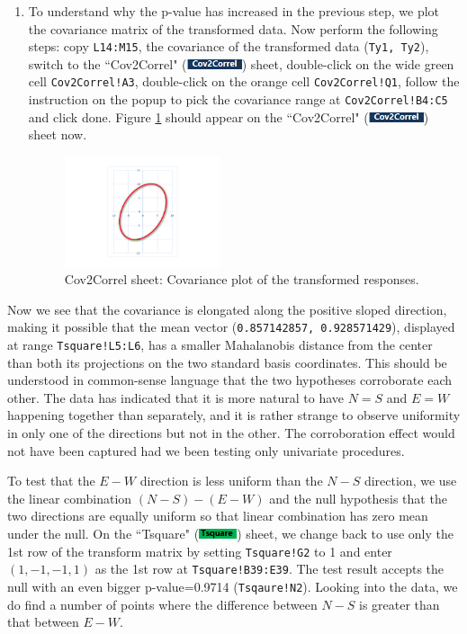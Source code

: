 \documentclass[article]{jss}
\newcommand{\shtTsquare}{``Tsquare" (\includegraphics[height=8pt, keepaspectratio=true]{TsquareSheetTab_png}) }
\newcommand{\shtCovCorrel}{``Cov2Correl" (\includegraphics[height=8pt, keepaspectratio=true]{Cov2CorrelSheetTab_png}) }
\begin{document}
\begin{enumerate}
                \item To understand why the p-value has increased in the previous step, we plot the covariance matrix of the transformed data. Now perform the following steps: copy \texttt{L14:M15}, the covariance of the transformed data (\texttt{Ty1, Ty2}), switch to the \shtCovCorrel sheet, double-click on the wide green cell \texttt{Cov2Correl!A3}, double-click on the orange cell \texttt{Cov2Correl!Q1}, follow the instruction on the popup to pick the covariance range at \texttt{Cov2Correl!B4:C5} and click done. Figure \ref{fig:Cov2Correl_PlotCov} should appear on the \shtCovCorrel sheet now.
                
                \begin{figure}
                        \includegraphics[width=130pt,keepaspectratio=true]{img/Cov2Correl_PlotCov}
                        \vspace{-20pt}\centering\protect\caption{Cov2Correl sheet: Covariance plot of the transformed responses.}\label{fig:Cov2Correl_PlotCov}
                \end{figure}
                
        \end{enumerate}
        
        Now we see that the covariance is elongated along the positive sloped direction, making it possible that the mean vector (\texttt{0.857142857, 0.928571429}), displayed at range \texttt{Tsquare!L5:L6}, has a smaller Mahalanobis distance from the center than both its projections on the two standard basis coordinates. This should be understood in common-sense language that the two hypotheses corroborate each other. The data has indicated that it is more natural to have $N=S$ and $E=W$ happening together than separately, and it is rather strange to observe uniformity in only one of the directions but not in the other. The corroboration effect would not have been captured had we been testing only univariate procedures.
        
        
        To test that the $E-W$ direction is less uniform than the $N-S$ direction, we use the linear combination $(N-S)-(E-W)$ and the null hypothesis that the two directions are equally uniform so that linear combination has zero mean under the null. On the \shtTsquare sheet, we change back to use only the 1st row of the transform matrix by setting \texttt{Tsquare!G2} to 1 and enter $(1,-1,-1,1)$ as the 1st row at \texttt{Tsquare!B39:E39}. The test result accepts the null with an even bigger p-value=0.9714 (\texttt{Tsqaure!N2}). Looking into the data, we do find a number of points where the difference between $N-S$ is greater than that between $E-W$.
        
\end{document}
